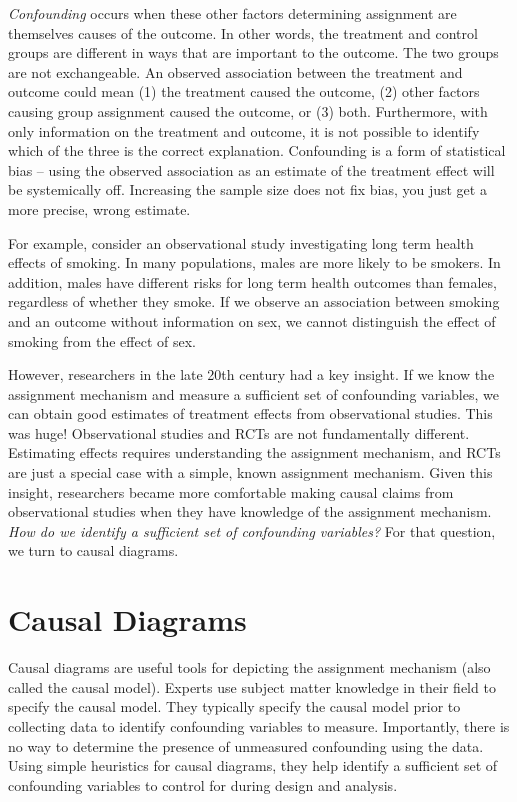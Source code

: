 \documentclass[]{book}
\begin{document}
\emph{Confounding} occurs when these other factors determining assignment are themselves causes of the outcome. In other words, the treatment and control groups are different in ways that are important to the outcome. The two groups are not exchangeable. An observed association between the treatment and outcome could mean (1) the treatment caused the outcome, (2) other factors causing group assignment caused the outcome, or (3) both. Furthermore, with only information on the treatment and outcome, it is not possible to identify which of the three is the correct explanation. Confounding is a form of statistical bias -- using the observed association as an estimate of the treatment effect will be systemically off. Increasing the sample size does not fix bias, you just get a more precise, wrong estimate.

For example, consider an observational study investigating long term health effects of smoking. In many populations, males are more likely to be smokers. In addition, males have different risks for long term health outcomes than females, regardless of whether they smoke. If we observe an association between smoking and an outcome without information on sex, we cannot distinguish the effect of smoking from the effect of sex.

However, researchers in the late 20th century had a key insight. If we know the assignment mechanism and measure a sufficient set of confounding variables, we can obtain good estimates of treatment effects from observational studies. This was huge! Observational studies and RCTs are not fundamentally different. Estimating effects requires understanding the assignment mechanism, and RCTs are just a special case with a simple, known assignment mechanism. Given this insight, researchers became more comfortable making causal claims from observational studies when they have knowledge of the assignment mechanism. \emph{How do we identify a sufficient set of confounding variables?} For that question, we turn to causal diagrams.

\hypertarget{causal-diagrams}{%
\section{Causal Diagrams}\label{causal-diagrams}}

Causal diagrams are useful tools for depicting the assignment mechanism (also called the causal model). Experts use subject matter knowledge in their field to specify the causal model. They typically specify the causal model prior to collecting data to identify confounding variables to measure. Importantly, there is no way to determine the presence of unmeasured confounding using the data. Using simple heuristics for causal diagrams, they help identify a sufficient set of confounding variables to control for during design and analysis.
\end{document}
